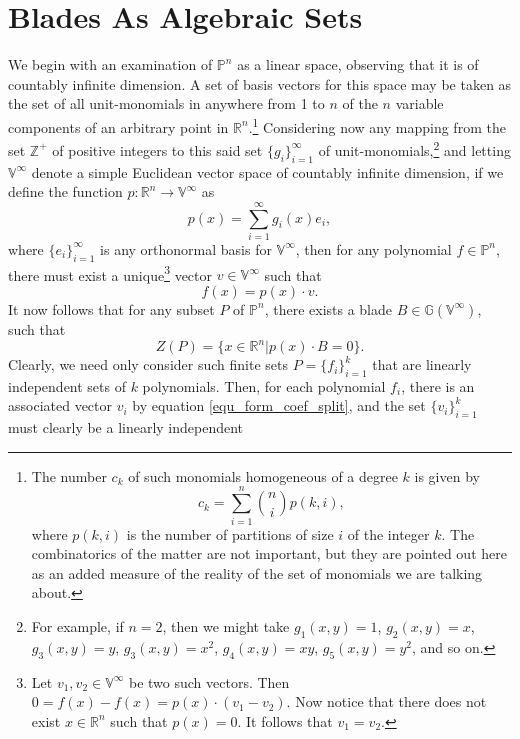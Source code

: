 \documentclass{birkjour}
\theoremstyle{definition}
\theoremstyle{remark}
\numberwithin{equation}{section}
\newcommand{\G}{\mathbb{G}}
\newcommand{\V}{\mathbb{V}}
\newcommand{\R}{\mathbb{R}}
\newcommand{\Z}{\mathbb{Z}}
\newcommand{\Poly}{\mathbb{P}}
\begin{document}
\section{Blades As Algebraic Sets}

We begin with an examination of $\Poly^n$ as a linear space, observing that
it is of countably infinite dimension.  A set of basis vectors for this space may be taken
as the set of all unit-monomials in anywhere from 1 to $n$ of the $n$ variable components
of an arbitrary point in $\R^n$.\footnote{The
number $c_k$ of such monomials homogeneous of a degree $k$ is given by
\begin{equation*}
c_k=\sum_{i=1}^n\binom{n}{i}p(k,i),
\end{equation*}
where $p(k,i)$ is the number of partitions of size $i$ of the integer $k$.  The
combinatorics of the matter are not important, but they are pointed out here as an added
measure of the reality of the set of monomials we are talking about.}
Considering now any mapping from the set $\Z^+$ of
positive integers to this said set $\{g_i\}_{i=1}^\infty$ of unit-monomials,\footnote{For example,
if $n=2$, then we might take $g_1(x,y)=1$, $g_2(x,y)=x$, $g_3(x,y)=y$, $g_3(x,y)=x^2$,
$g_4(x,y)=xy$, $g_5(x,y)=y^2$, and so on.}
and letting $\V^\infty$ denote a simple Euclidean vector space of countably infinite
dimension, if we define the function $p:\R^n\to\V^\infty$ as
\begin{equation}\label{equ_form_vector}
p(x) = \sum_{i=1}^\infty g_i(x)e_i,
\end{equation}
where $\{e_i\}_{i=1}^\infty$ is any orthonormal basis for $\V^\infty$, then for
any polynomial $f\in\Poly^n$, there must exist a unique\footnote{Let $v_1,v_2\in\V^\infty$
be two such vectors.  Then $0=f(x)-f(x)=p(x)\cdot (v_1-v_2)$.  Now notice that there
does not exist $x\in\R^n$ such that $p(x)=0$.  It follows that $v_1=v_2$.}
vector $v\in\V^\infty$ such that
\begin{equation}\label{equ_form_coef_split}
f(x) = p(x)\cdot v.
\end{equation}
It now follows that for any subset $P$ of $\Poly^n$, there exists a blade $B\in\G(\V^\infty)$,
such that
\begin{equation}
Z(P) = \{x\in\R^n|p(x)\cdot B=0\}.
\end{equation}
Clearly, we need only consider such finite sets $P=\{f_i\}_{i=1}^k$ that are linearly independent
sets of $k$ polynomials.  Then, for each polynomial $f_i$, there is an associated vector $v_i$ by
equation \eqref{equ_form_coef_split}, and the set $\{v_i\}_{i=1}^k$ must clearly be a linearly independent
\end{document}
